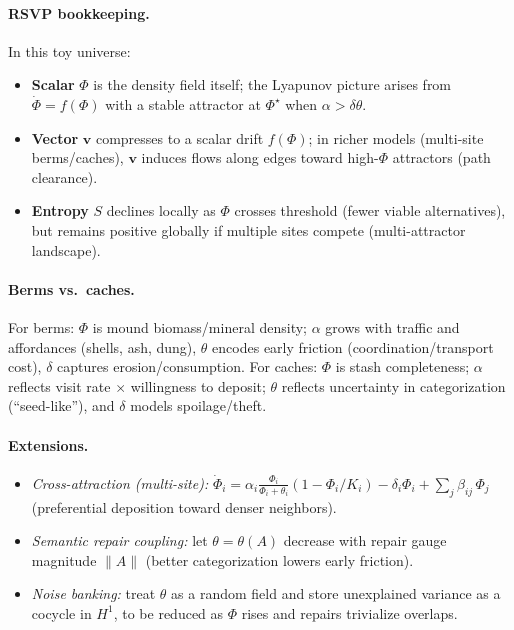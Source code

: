 \documentclass{article}
\begin{document}
\paragraph{RSVP bookkeeping.}
In this toy universe:
\begin{itemize}
\item \textbf{Scalar} $\Phi$ is the density field itself; the Lyapunov picture arises from $\dot{\Phi}=f(\Phi)$ with a stable attractor at $\Phi^\star$ when $\alpha>\delta\theta$.
\item \textbf{Vector} $\mathbf{v}$ compresses to a scalar drift $f(\Phi)$; in richer models (multi-site berms/caches), $\mathbf{v}$ induces flows along edges toward high-$\Phi$ attractors (path clearance).
\item \textbf{Entropy} $S$ declines locally as $\Phi$ crosses threshold (fewer viable alternatives), but remains positive globally if multiple sites compete (multi-attractor landscape).
\end{itemize}

\paragraph{Berms vs.\ caches.}
For berms: $\Phi$ is mound biomass/mineral density; $\alpha$ grows with traffic and affordances (shells, ash, dung),
$\theta$ encodes early friction (coordination/transport cost), $\delta$ captures erosion/consumption.
For caches: $\Phi$ is stash completeness; $\alpha$ reflects visit rate $\times$ willingness to deposit;
$\theta$ reflects uncertainty in categorization (“seed-like”), and $\delta$ models spoilage/theft.

\paragraph{Extensions.}
\begin{itemize}
\item \emph{Cross-attraction (multi-site):} $\dot{\Phi}_i = \alpha_i \frac{\Phi_i}{\Phi_i+\theta_i}(1-\Phi_i/K_i) - \delta_i \Phi_i + \sum_j \beta_{ij}\,\Phi_j$ (preferential deposition toward denser neighbors).
\item \emph{Semantic repair coupling:} let $\theta=\theta(A)$ decrease with repair gauge magnitude $\|A\|$ (better categorization lowers early friction).
\item \emph{Noise banking:} treat $\theta$ as a random field and store unexplained variance as a cocycle in $H^1$, to be reduced as $\Phi$ rises and repairs trivialize overlaps.
\end{itemize}
\end{document}
